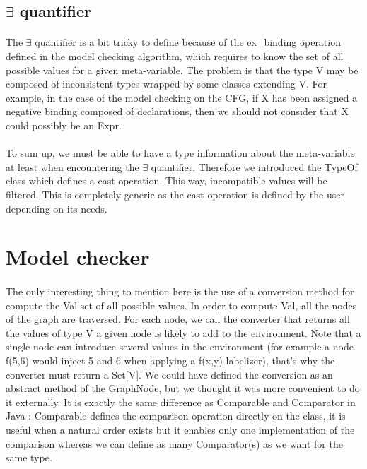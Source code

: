 \documentclass{report}
\begin{document}
\subsection{$\exists$ quantifier}

\paragraph{}
\hspace{4mm}The $\exists$ quantifier is a bit tricky to define because of the ex\_binding operation defined in the model checking algorithm, which requires
to know the set of all possible values for a given meta-variable. The problem is that the type V may be composed of inconsistent types wrapped by some classes extending V. For example, in the case of the model checking on the CFG,
if X has been assigned a negative binding composed of declarations, then we should not consider that X could possibly be an Expr.

\paragraph{}
\hspace{4mm}To sum up, we must be able to have a type information about the meta-variable at least when encountering the $\exists$ quantifier. Therefore
we introduced the TypeOf class which defines a cast operation. This way, incompatible values will be filtered. This is completely generic as the cast operation is defined by the user depending on its needs.

\section{Model checker}

\paragraph{}
\hspace{4mm}The only interesting thing to mention here is the use of a conversion method for compute the Val set of all possible values.
In order to compute Val, all the nodes of the graph are traversed. For each node, we call the converter that returns all the values of type V a given node is likely to add to the environment. Note that 
a single node can introduce several values in the environment (for example a node f(5,6) would inject 5 and 6 when applying a f(x,y) labelizer), that's why the converter must return a Set[V]. We could have defined
the conversion as an abstract method of the GraphNode, but we thought it was more convenient to do it externally. It is exactly the same difference as
Comparable and Comparator in Java : Comparable defines the comparison operation directly on the class, it is useful when a natural order exists but it enables only one implementation
of the comparison whereas we can define as many Comparator(s) as we want for the same type.
\end{document}
